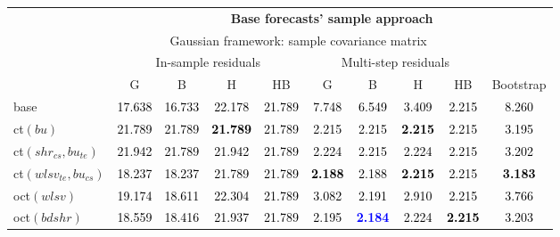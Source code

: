 
\begin{tabular}[t]{>{\centering\arraybackslash}m{2.5cm}ccccccccc}
\toprule
\multicolumn{1}{c}{\textbf{}} & \multicolumn{9}{c}{\textbf{Base forecasts' sample approach}} \\
\cmidrule(l{0pt}r{0pt}){2-10}
\multicolumn{1}{c}{} & \multicolumn{8}{c}{Gaussian framework: sample covariance matrix} & \multicolumn{1}{c}{} \\
\multicolumn{1}{c}{} & \multicolumn{4}{c}{In-sample residuals} & \multicolumn{4}{c}{Multi-step residuals} & \multicolumn{1}{c}{} \\
\multirow{-5}{*}{\parbox{2cm}{\centering\textbf{Reconciliation\\approach}}} & G & B & H & HB & G & B & H & HB & \multirow{-4}{*}{Bootstrap}\\
\midrule
base & \textcolor{black}{17.638} & \textcolor{black}{16.733} & \textcolor{black}{22.178} & \textcolor{black}{21.789} & \textcolor{black}{7.748} & \textcolor{black}{6.549} & \textcolor{black}{3.409} & \textcolor{black}{2.215} & \textcolor{black}{8.260}\\
ct$(bu)$ & \textcolor{black}{21.789} & \textcolor{black}{21.789} & \textcolor{black}{\textbf{21.789}} & \textcolor{black}{21.789} & \textcolor{black}{2.215} & \textcolor{black}{2.215} & \textcolor{black}{\textbf{2.215}} & \textcolor{black}{2.215} & \textcolor{black}{3.195}\\
ct$(shr_{cs}, bu_{te})$ & \textcolor{black}{21.942} & \textcolor{black}{21.789} & \textcolor{black}{21.942} & \textcolor{black}{21.789} & \textcolor{black}{2.224} & \textcolor{black}{2.215} & \textcolor{black}{2.224} & \textcolor{black}{2.215} & \textcolor{black}{3.202}\\
ct$(wlsv_{te}, bu_{cs})$ & \textcolor{black}{18.237} & \textcolor{black}{18.237} & \textcolor{black}{21.789} & \textcolor{black}{21.789} & \textcolor{black}{\textbf{2.188}} & \textcolor{black}{2.188} & \textcolor{black}{\textbf{2.215}} & \textcolor{black}{2.215} & \textcolor{black}{\textbf{3.183}}\\
oct$(wlsv)$ & \textcolor{black}{19.174} & \textcolor{black}{18.611} & \textcolor{black}{22.304} & \textcolor{black}{21.789} & \textcolor{black}{3.082} & \textcolor{black}{2.191} & \textcolor{black}{2.910} & \textcolor{black}{2.215} & \textcolor{black}{3.766}\\
oct$(bdshr)$ & \textcolor{black}{18.559} & \textcolor{black}{18.416} & \textcolor{black}{21.937} & \textcolor{black}{21.789} & \textcolor{black}{2.195} & \textcolor{blue}{\textbf{2.184}} & \textcolor{black}{2.224} & \textcolor{black}{\textbf{2.215}} & \textcolor{black}{3.203}\\

\end{tabular}
